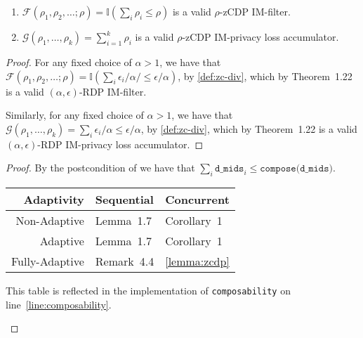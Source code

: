 \documentclass{article}
\begin{document}
\begin{lemma}
  \label{lemma:zcdp}
  \begin{enumerate}
    \item $\mathcal{F}(\rho_1, \rho_2, \ldots; \rho) = \mathbb{I}(\sum_i \rho_i \leq \rho)$ is a valid $\rho$-zCDP IM-filter.
    \item $\mathcal{G}(\rho_1, \ldots, \rho_k) = \sum_{i=1}^k \rho_i$ is a valid $\rho$-zCDP IM-privacy loss accumulator.
  \end{enumerate}
\end{lemma}

\begin{proof}
  For any fixed choice of $\alpha > 1$, we have that $\mathcal{F}(\rho_1, \rho_2, \ldots; \rho) = \mathbb{I}(\sum_i \epsilon_i / \alpha / \leq \epsilon / \alpha)$,
  by \ref{def:zc-div}, which by Theorem~1.22\cite{vadhan2021concurrent} is a valid $(\alpha, \epsilon)$-RDP IM-filter.
  
  Similarly, for any fixed choice of $\alpha > 1$, we have that $\mathcal{G}(\rho_1, \ldots, \rho_k) = \sum_i \epsilon_i / \alpha \leq \epsilon / \alpha$,
  by \ref{def:zc-div}, which by Theorem~1.22\cite{vadhan2021concurrent} is a valid $(\alpha, \epsilon)$-RDP IM-privacy loss accumulator.
\end{proof}

\begin{proof}
  By the postcondition of  we have that $\sum_i \texttt{d\_mids}_i \le \texttt{compose(d\_mids)}$.

  \begin{center}
    \begin{tabular}{ r | l l }
      Adaptivity & Sequential & Concurrent \\ 
      \hline
      Non-Adaptive & Lemma~1.7\cite{bun2016concentrated} & Corollary~1\cite{lyu2022interactive} \\  
      Adaptive & Lemma~1.7\cite{bun2016concentrated} & Corollary~1\cite{lyu2022interactive} \\
      Fully-Adaptive & Remark~4.4\cite{feldman2022individual} & \ref{lemma:zcdp}
    \end{tabular}

    This table is reflected in the implementation of \texttt{composability} on line~\ref{line:composability}.
  \end{center}
  
\end{proof}



\end{document}
